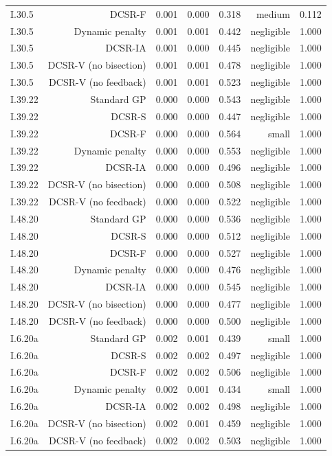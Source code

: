 \begin{tabular}{lrrrrrr}
I.30.5 & DCSR-F & 0.001 & 0.000 & 0.318 & medium & 0.112 \\
I.30.5 & Dynamic penalty & 0.001 & 0.001 & 0.442 & negligible & 1.000 \\
I.30.5 & DCSR-IA & 0.001 & 0.000 & 0.445 & negligible & 1.000 \\
I.30.5 & DCSR-V (no bisection) & 0.001 & 0.001 & 0.478 & negligible & 1.000 \\
I.30.5 & DCSR-V (no feedback) & 0.001 & 0.001 & 0.523 & negligible & 1.000 \\
I.39.22 & Standard GP & 0.000 & 0.000 & 0.543 & negligible & 1.000 \\
I.39.22 & DCSR-S & 0.000 & 0.000 & 0.447 & negligible & 1.000 \\
I.39.22 & DCSR-F & 0.000 & 0.000 & 0.564 & small & 1.000 \\
I.39.22 & Dynamic penalty & 0.000 & 0.000 & 0.553 & negligible & 1.000 \\
I.39.22 & DCSR-IA & 0.000 & 0.000 & 0.496 & negligible & 1.000 \\
I.39.22 & DCSR-V (no bisection) & 0.000 & 0.000 & 0.508 & negligible & 1.000 \\
I.39.22 & DCSR-V (no feedback) & 0.000 & 0.000 & 0.522 & negligible & 1.000 \\
I.48.20 & Standard GP & 0.000 & 0.000 & 0.536 & negligible & 1.000 \\
I.48.20 & DCSR-S & 0.000 & 0.000 & 0.512 & negligible & 1.000 \\
I.48.20 & DCSR-F & 0.000 & 0.000 & 0.527 & negligible & 1.000 \\
I.48.20 & Dynamic penalty & 0.000 & 0.000 & 0.476 & negligible & 1.000 \\
I.48.20 & DCSR-IA & 0.000 & 0.000 & 0.545 & negligible & 1.000 \\
I.48.20 & DCSR-V (no bisection) & 0.000 & 0.000 & 0.477 & negligible & 1.000 \\
I.48.20 & DCSR-V (no feedback) & 0.000 & 0.000 & 0.500 & negligible & 1.000 \\
I.6.20a & Standard GP & 0.002 & 0.001 & 0.439 & small & 1.000 \\
I.6.20a & DCSR-S & 0.002 & 0.002 & 0.497 & negligible & 1.000 \\
I.6.20a & DCSR-F & 0.002 & 0.002 & 0.506 & negligible & 1.000 \\
I.6.20a & Dynamic penalty & 0.002 & 0.001 & 0.434 & small & 1.000 \\
I.6.20a & DCSR-IA & 0.002 & 0.002 & 0.498 & negligible & 1.000 \\
I.6.20a & DCSR-V (no bisection) & 0.002 & 0.001 & 0.459 & negligible & 1.000 \\
I.6.20a & DCSR-V (no feedback) & 0.002 & 0.002 & 0.503 & negligible & 1.000 \\
\bottomrule
\end{tabular}
